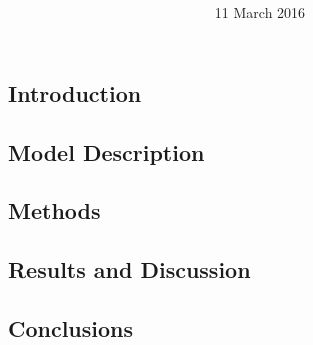 \documentclass[12pt]{article}
\title{
\vspace{1in}
\textmd{\textbf{\hmwkTitle}}\\
\textit{\normalsize \hmwkClass}
\vspace{3in}
}
\author{\textbf{\hmwkAuthorName}}
\date{11 March 2016} %
\begin{document}
\maketitle
\thispagestyle{empty}
\clearpage\maketitle

\linespread{1.0}

\begin{abstract}
\noindent \textit{\lipsum[1]}
\end{abstract}

\subsection{Introduction}
\lipsum[2]

\subsection{Model Description}
\lipsum[2]

\subsection{Methods}
\lipsum[2]

\subsection{Results and Discussion}
\lipsum[2]

\subsection{Conclusions}
\lipsum[1]


\renewcommand{\refname}{\normalfont\selectfont \large  \textbf{References}} 


\end{document}
